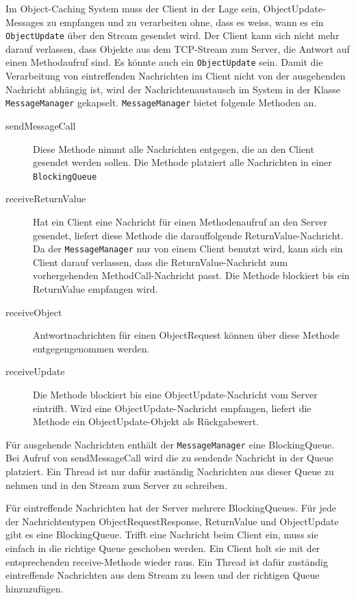 Im Object-Caching System muss der Client in der Lage sein, Object\-Update\--Messages zu empfangen und zu verarbeiten ohne, dass es weiss, wann es ein \verb|ObjectUpdate| über den Stream gesendet wird. Der Client kann sich nicht mehr darauf verlassen, dass Objekte aus dem TCP-Stream zum Server, die Antwort auf einen Methodaufruf sind. Es könnte auch ein \texttt{ObjectUpdate} sein. Damit die Verarbeitung von eintreffenden Nach\-richten im Client nicht von der ausgehenden Nachricht abhängig ist, wird der Nach\-richt\-enaustausch im System in der Klasse \verb|MessageManager| gekapselt. \texttt{MessageManager} bietet folgende Methoden an.

\begin{description}
\item[sendMessageCall] Diese Methode nimmt alle Nachrichten entgegen, die an den Client gesendet werden sollen. Die Methode platziert alle Nachrichten in einer \verb|BlockingQueue| 
\item[receiveReturnValue] Hat ein Client eine Nachricht für einen Methodenaufruf an den Server gesendet, liefert diese Methode die darauffolgende ReturnValue-Nachricht. Da der \verb+MessageManager+ nur von einem Client benutzt wird, kann sich ein Client darauf verlassen, dass die ReturnValue-Nachricht zum vorhergehenden MethodCall-Nach\-richt \-passt.  Die Methode blockiert bis ein ReturnValue empfangen wird.
\item[receiveObject] Antwortnachrichten für einen ObjectRequest können über diese Methode entgegengenommen werden. 
\item[receiveUpdate] Die Methode blockiert bis eine ObjectUpdate-Nachricht vom Server eintrifft. Wird eine ObjectUpdate-Nachricht empfangen, liefert die Methode ein ObjectUpdate-Objekt als Rückgabewert.
\end{description}

Für ausgehende Nachrichten enthält der \verb|MessageManager| eine BlockingQueue. Bei Aufruf von sendMessageCall wird die zu sendende Nachricht in der Queue platziert. Ein Thread ist nur dafür zuständig Nachrichten aus dieser Queue zu nehmen und in den Stream zum Server zu schreiben.


Für eintreffende Nachrichten hat der Server mehrere BlockingQueues. Für jede der Nachrichtentypen ObjectRequestResponse, ReturnValue und ObjectUpdate gibt es eine BlockingQueue. Trifft eine Nachricht beim Client ein, muss sie einfach in die richtige Queue geschoben werden. Ein Client holt sie mit der entsprechenden receive-Methode wieder raus. Ein Thread ist dafür zuständig eintreffende Nachrichten aus dem Stream zu lesen und der richtigen Queue hinzuzufügen. 

